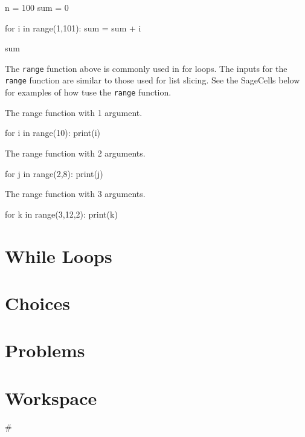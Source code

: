 \documentclass{ximera}
\begin{document}
\begin{sageCell}
n = 100
sum = 0

for i in range(1,101):
        sum = sum + i

sum
\end{sageCell}

The \verb|range| function above is commonly used in for loops. The inputs for the \verb|range| function are similar to those used for list slicing. See the SageCells below for examples of how tuse the \verb|range| function.

The range function with 1 argument.
\begin{sageCell}
for i in range(10):
     print(i)
\end{sageCell}

The range function with 2 arguments.
\begin{sageCell}
for j in range(2,8):
     print(j)
\end{sageCell}

The range function with 3 arguments.
\begin{sageCell}
for k in range(3,12,2):
     print(k)
\end{sageCell}

\section{While Loops}



\section{Choices}



\section{Problems}

\begin{question}
\end{question}

\begin{question}
\end{question}

\section{Workspace}

\begin{sageCell}
#
\end{sageCell}
\end{document}
